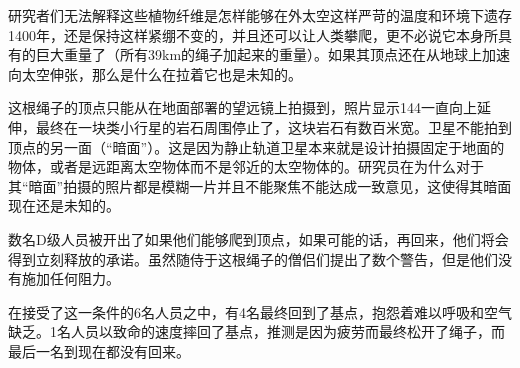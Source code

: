 研究者们无法解释这些植物纤维是怎样能够在外太空这样严苛的温度和环境下遗存1400年，还是保持这样紧绷不变的，并且还可以让人类攀爬，更不必说它本身所具有的巨大重量了（所有39km的绳子加起来的重量）。如果其顶点还在从地球上加速向太空伸张，那么是什么在拉着它也是未知的。

这根绳子的顶点只能从在地面部署的望远镜上拍摄到，照片显示144一直向上延伸，最终在一块类小行星的岩石周围停止了，这块岩石有数百米宽。卫星不能拍到顶点的另一面（“暗面”）。这是因为静止轨道卫星本来就是设计拍摄固定于地面的物体，或者是远距离太空物体而不是邻近的太空物体的。研究员在为什么对于其“暗面”拍摄的照片都是模糊一片并且不能聚焦不能达成一致意见，这使得其暗面现在还是未知的。

数名D级人员被开出了如果他们能够爬到顶点，如果可能的话，再回来，他们将会得到立刻释放的承诺。虽然随侍于这根绳子的僧侣们提出了数个警告，但是他们没有施加任何阻力。

在接受了这一条件的6名人员之中，有4名最终回到了基点，抱怨着难以呼吸和空气缺乏。1名人员以致命的速度摔回了基点，推测是因为疲劳而最终松开了绳子，而最后一名到现在都没有回来。
